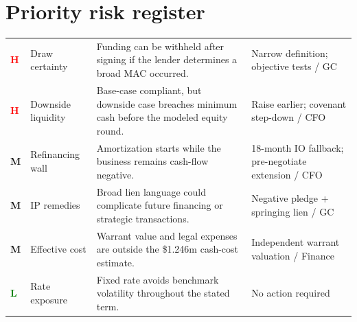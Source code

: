 \section{Priority risk register}

\begin{tabularx}{\textwidth}{@{}C{0.33in}L{0.18\textwidth}Y L{0.20\textwidth}@{}}
\toprule
{}
 &  &  &  \\
\midrule
{}\textcolor{red}{\bfseries H} & Draw certainty & Funding can be withheld after signing if the lender determines a broad MAC occurred. & Narrow definition; objective tests / GC \\
\textcolor{red}{\bfseries H} & Downside liquidity & Base-case compliant, but downside case breaches minimum cash before the modeled equity round. & Raise earlier; covenant step-down / CFO \\
\textcolor{amber}{\bfseries M} & Refinancing wall & Amortization starts while the business remains cash-flow negative. & 18-month IO fallback; pre-negotiate extension / CFO \\
\textcolor{amber}{\bfseries M} & IP remedies & Broad lien language could complicate future financing or strategic transactions. & Negative pledge + springing lien / GC \\
\textcolor{amber}{\bfseries M} & Effective cost & Warrant value and legal expenses are outside the \$1.246m cash-cost estimate. & Independent warrant valuation / Finance \\
\textcolor{green}{\bfseries L} & Rate exposure & Fixed rate avoids benchmark volatility throughout the stated term. & No action required \\
\bottomrule
\end{tabularx}
